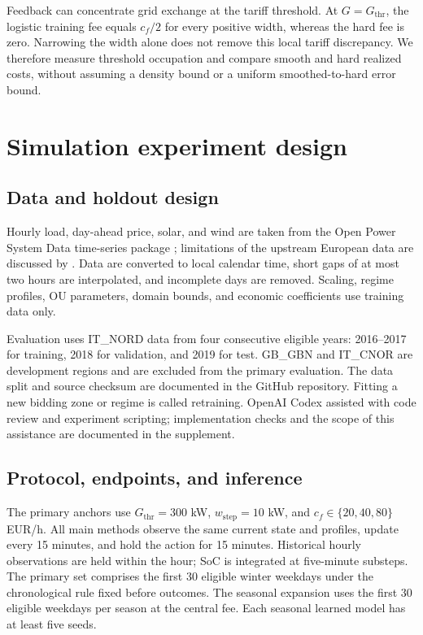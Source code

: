 \documentclass[preprint,11pt]{elsarticle}
\theoremstyle{plain}
\theoremstyle{remark}
\begin{document}
Feedback can concentrate grid exchange at the tariff threshold. At
$G=G_{\mathrm{thr}}$, the logistic training fee equals $c_f/2$ for every
positive width, whereas the hard fee is zero. Narrowing the width alone
does not remove this local tariff discrepancy. We therefore measure
threshold occupation and compare smooth and hard realized costs, without
assuming a density bound or a uniform smoothed-to-hard error bound.

\section{Simulation experiment design}\label{sec:design}

\subsection{Data and holdout design}

Hourly load, day-ahead price, solar, and wind are taken from the Open Power
System Data time-series package \citep{Wiese2019}; limitations of the upstream
European data are discussed by \citet{Hirth2018}. Data are converted to local
calendar time, short gaps of at most two hours are interpolated, and incomplete
days are removed. Scaling, regime profiles, OU parameters, domain bounds, and
economic coefficients use training data only.

Evaluation uses IT\_NORD data from four consecutive eligible years:
2016--2017 for training, 2018 for validation, and 2019 for test. GB\_GBN and
IT\_CNOR are development regions and are excluded from the primary evaluation.
The data split and source checksum are documented in the GitHub repository.
Fitting a new bidding zone or regime is called retraining.
OpenAI Codex assisted with code review and experiment scripting; implementation
checks and the scope of this assistance are documented in the supplement.

\subsection{Protocol, endpoints, and inference}

The primary anchors use $G_{\mathrm{thr}}=300$ kW,
$w_{\mathrm{step}}=10$ kW, and $c_f\in\{20,40,80\}$ EUR/h. All main methods
observe the same current state and profiles, update every 15 minutes, and hold
the action for 15 minutes. Historical hourly observations are held within the
hour; SoC is integrated at five-minute substeps. The primary set comprises the
first 30 eligible winter weekdays under the chronological rule fixed before
outcomes. The seasonal expansion uses the first 30 eligible weekdays per season at the
central fee. Each seasonal learned model has at least five seeds.
\end{document}
